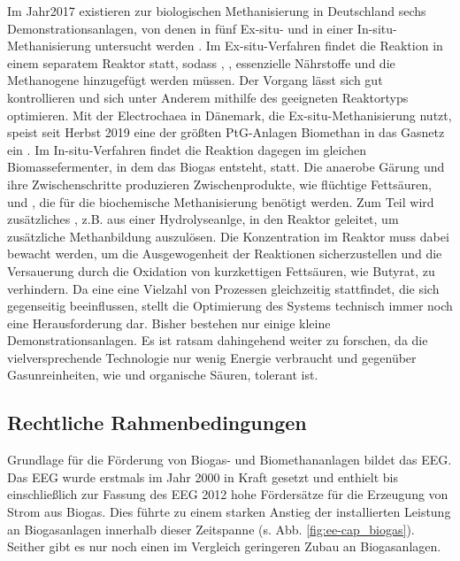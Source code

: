 

Im Jahr\SI{2017}{\relax} existieren zur biologischen Methanisierung in Deutschland sechs Demonstrationsanlagen, von denen in fünf Ex-situ- und in einer In-situ-Methanisierung untersucht werden \parencite{4.2b17}. Im Ex-situ-Verfahren findet die Reaktion in einem separatem Reaktor statt, sodass , , essenzielle Nährstoffe und die Methanogene hinzugefügt werden müssen. Der Vorgang lässt sich gut kontrollieren und sich unter Anderem mithilfe des geeigneten Reaktortyps optimieren. Mit der Electrochaea in Dänemark, die Ex-situ-Methanisierung nutzt, speist seit Herbst 2019 eine der größten PtG-Anlagen Biomethan in das Gasnetz ein \parencite{Echae19}.\parencite{KGKK2019} \parencite{AONC2019} \parencite{VRM2019} \newline 
Im In-situ-Verfahren findet die Reaktion dagegen im gleichen Biomassefermenter, in dem das Biogas entsteht, statt. Die anaerobe Gärung und ihre Zwischenschritte produzieren Zwischenprodukte, wie flüchtige Fettsäuren,  und , die für die biochemische Methanisierung benötigt werden. Zum Teil wird zusätzliches , z.B. aus einer Hydrolyseanlge, in den  Reaktor geleitet, um zusätzliche Methanbildung auszulösen. Die  Konzentration im Reaktor muss dabei bewacht werden, um die Ausgewogenheit der Reaktionen sicherzustellen und die Versauerung durch die Oxidation von kurzkettigen Fettsäuren, wie Butyrat, zu verhindern. Da eine eine Vielzahl von Prozessen gleichzeitig stattfindet, die sich gegenseitig beeinflussen, stellt die Optimierung des Systems technisch immer noch eine Herausforderung dar. Bisher bestehen nur einige kleine Demonstrationsanlagen. Es ist ratsam dahingehend weiter zu forschen, da die vielversprechende Technologie nur wenig Energie verbraucht und gegenüber Gasunreinheiten, wie  und organische Säuren, tolerant ist. 
\parencite{VRM2019} \parencite{KGKK2019} \parencite{AONC2019} \smallskip






\subsection{Rechtliche Rahmenbedingungen}\label{chap:law_theo}

Grundlage für die Förderung von Biogas- und Biomethananlagen bildet das \gls{EEG}. Das \gls{EEG} wurde erstmals im Jahr 2000 in Kraft gesetzt und enthielt bis einschließlich zur Fassung des \gls{EEG} \SI{2012}{\relax} hohe Fördersätze für die Erzeugung von Strom aus Biogas. Dies führte zu einem starken Anstieg der installierten Leistung an Biogasanlagen innerhalb dieser Zeitspanne (s. Abb. \ref{fig:ee-cap_biogas}). Seither gibt es nur noch einen im Vergleich geringeren Zubau an Biogasanlagen. \parencite{DanielGromke2019}\smallskip

